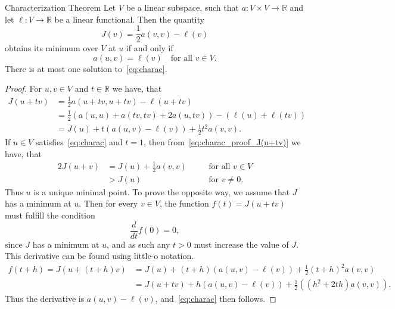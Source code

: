 
\begin{thmx}{Characterization Theorem}
    Let $V$ be a linear subspace, such that
        \(
            a: V \times V \rightarrow \mathbb{R}
        \) and
     let
        \(
            \ell: V \rightarrow \mathbb{R}
        \)
    be a linear functional. Then the quantity
        \[
            J(v)=\frac{1}{2} a(v,v) - \ell(v)
        \]
    obtains its minimum over $V$ at $u$ if and only if
        \begin{equation}
            a(u,v) = \ell(v) \quad \text{for all } v \in V.
        \label{eq:charac}
        \end{equation}
    There is at most one solution to~\eqref{eq:charac}.\label{thm:charac_theorem}
\end{thmx}

\begin{proof}
    For $u,v \in V$ and $t \in \mathbb{R}$ we have, that
    \begin{align}
        J(u+tv) &= \frac{1}{2} a(u+tv,u+tv) - \ell(u+tv) \nonumber \\
        &= \frac{1}{2} \left( a(u,u) + a(tv,tv) + 2a(u,tv) \right) - \left(  \ell(u) + \ell(tv)\right) \nonumber \\
        &= J(u) + t\left( a(u,v) - \ell(v) \right) + \frac{1}{2}t^2a(v,v). \label{eq:charac_proof_J(u+tv)}
    \end{align}
    If $u \in V$ satisfies~\eqref{eq:charac} and $t=1$, then from~\eqref{eq:charac_proof_J(u+tv)} we have, that
    \begin{alignat}{2}
        J(u+v) &= J(u) + \frac{1}{2}a(v,v) \quad &&\text{for all } v\in V  \nonumber \\
        &> J(u) \quad &&\text{for } v \neq 0.
    \end{alignat}
    Thus $u$ is a unique minimal point. 
    To prove the opposite way, we assume that $J$ has a minimum at $u$.
    Then for every $v\in V$, the function $f(t)= J(u+tv)$ must fulfill the condition
    \begin{equation*}
        \frac{d}{dt}f(0) = 0,
    \end{equation*}
    since $J$ has a minimum at $u$, and as such any $t>0$ must increase the 
    value of $J$.
    This derivative can be found using little-o notation.
    \begin{align*}
          f(t+h) = J(u+(t+h)v) &= J(u) + (t+h) (a(u,v) - \ell(v)) + \frac{1}{2}{(t+h)}^2 a(v,v) \\
          &= J(u+tv) + h(a(u,v) - \ell(v)) + \frac{1}{2}((h^2+2th)a(v,v)).
    \end{align*}
    Thus the derivative is $a(u,v) - \ell(v)$, and~\eqref{eq:charac} then follows.
\end{proof}